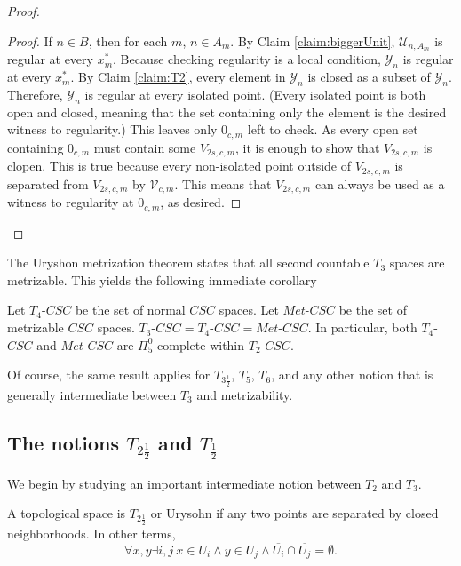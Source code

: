 \documentclass[11pt]{amsart}
\theoremstyle{remark}
\begin{document}
\begin{proof}
\begin{proof}
        If $n\in B$, then for each $m$, $n\in A_m$.
        By Claim \ref{claim:biggerUnit}, $\mathcal{U}_{n,A_m}$ is regular at every $x^*_m$.
        Because checking regularity is a local condition, $\mathcal{Y}_n$ is regular at every $x^*_m$.
        By Claim \ref{claim:T2}, every element in $\mathcal{Y}_n$ is closed as a subset of $\mathcal{Y}_n$.
        Therefore, $\mathcal{Y}_n$ is regular at every isolated point.
        (Every isolated point is both open and closed, meaning that the set containing only the element is the desired witness to regularity.)
        This leaves only $0_{c,m}$ left to check.
        As every open set containing $0_{c,m}$ must contain some $V_{2s,c,m}$, it is enough to show that $V_{2s,c,m}$ is clopen.
        This is true because every non-isolated point outside of $V_{2s,c,m}$ is separated from $V_{2s,c,m}$ by $\mathcal{V}_{c,m}$.
        This means that $V_{2s,c,m}$ can always be used as a witness to regularity at $0_{c,m}$, as desired.
    \end{proof}

\end{proof}

The Uryshon metrization theorem states that all second countable $T_3$ spaces are metrizable.
This yields the following immediate corollary
\begin{corollary}
     Let $T_4$-$CSC$ be the set of normal $CSC$ spaces.
     Let $Met$-$CSC$ be the set of metrizable $CSC$ spaces.
    $T_3$-$CSC=T_4$-$CSC=Met$-$CSC$.
    In particular, both $T_4$-$CSC$ and $Met$-$CSC$ are $\Pi_5^0$ complete within $T_2$-$CSC$.
\end{corollary}

Of course, the same result applies for $T_{3\frac12}$, $T_5$, $T_6$, and any other notion that is generally intermediate between $T_3$ and metrizability.

\subsection{The notions $T_{2\frac12}$ and $T_{\frac12}$}

    We begin by studying an important intermediate notion between $T_2$ and $T_3$.

    \begin{definition}
        A topological space is $T_{2\frac12}$ or Urysohn if any two points are separated by closed neighborhoods.
        In other terms,
        \[\forall x,y \exists i,j ~ x\in U_i\land y\in U_j \land \overline{U_i}\cap\overline{U_j}=\emptyset.\]
    \end{definition}
\end{document}
